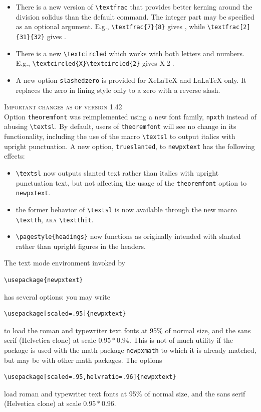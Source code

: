 \documentclass[11pt]{article}
\theoremstyle{oldplain}
\theoremstyle{plain}
\begin{document}
\begin{itemize}
\item There is a new version of \verb|\textfrac| that provides better kerning around the division solidus than the default command. The integer part may be specified as an optional argument. E.g., \verb|\textfrac{7}{8}| gives , while \verb|\textfrac[2]{31}{32}| gives .

\item There is a new \verb|\textcircled| which works with both letters and numbers.\\
 E.g., \verb|\textcircled{X}\textcircled{2}| gives \textcircled{X}\textcircled{2}.
\item A new option {\tt slashedzero} is provided for XeLaTeX and LaLaTeX only. It replaces the zero in lining style only to a zero with a reverse slash.
\end{itemize}

\textsc{Important changes as of version 1.42}\\
Option  {\tt theoremfont} was reimplemented using a new font family, {\tt npxth} instead of abusing \verb|\textsl|. By default,  users of {\tt theoremfont} will see no change in its functionality, including the use of the macro \verb|\textsl| to output italics with upright punctuation. A new option, {\tt trueslanted}, to {\tt newpxtext} has the following effects:
\begin{itemize}
\item
\verb|\textsl| now outputs slanted text rather than italics with upright punctuation text, but not affecting the usage of the {\tt theoremfont} option to {\tt newpxtext}.
\item the former behavior of \verb|\textsl| is now available through the new macro \verb|\textth|, \textsc{aka} \verb|\textthit|.
\item \verb|\pagestyle{headings}| now functions as originally intended with slanted rather than upright figures in the headers.
\end{itemize}

The text mode environment invoked by
\begin{verbatim}
\usepackage{newpxtext}
\end{verbatim}
has several options: you may write
\begin{verbatim}
\usepackage[scaled=.95]{newpxtext}
\end{verbatim}
to load the roman and typewriter text fonts at 95\% of normal size, and the sans serif (\textsf{Helvetica} clone) at scale $0.95*0.94$. This is not of much utility if the package is used with the math package {\tt newpxmath} to which it is already matched, but may be with other math packages. The options
\begin{verbatim}
\usepackage[scaled=.95,helvratio=.96]{newpxtext}
\end{verbatim}
load roman and typewriter text fonts at 95\% of normal size, and the sans serif (\textsf{Helvetica} clone) at scale $0.95*0.96$.
\end{document}
